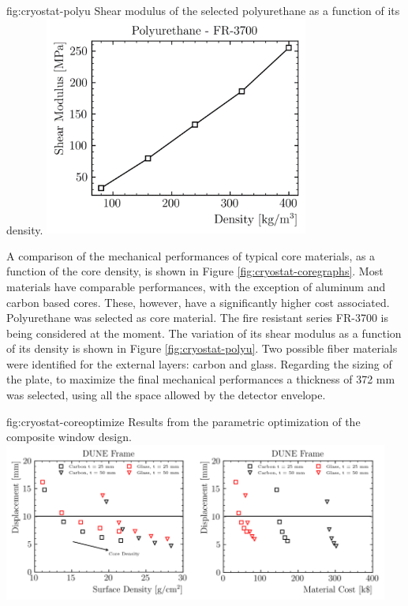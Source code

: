 \begin{dunefigure}{fig:cryostat-polyu}
{Shear modulus of the selected polyurethane as a function of its density.}
\includegraphics[width=0.65\textwidth]{graphics/cryostat/cryostat-polyu.png}
\end{dunefigure}

A comparison of the mechanical performances of typical core materials, as a function of the core density, is shown in Figure \ref{fig:cryostat-coregraphs}. Most materials have comparable performances, with the exception of aluminum and carbon based cores. These, however, have a significantly higher cost associated. Polyurethane was selected as core material. The fire resistant series FR-3700 is being considered at the moment. The variation of its shear modulus as a function of its density is shown in Figure \ref{fig:cryostat-polyu}. Two possible fiber materials were identified for the external layers: carbon and glass. Regarding the sizing of the plate, to maximize the final mechanical performances a thickness of 372 mm was selected, using all the space allowed by the detector envelope.

\begin{dunefigure}{fig:cryostat-coreoptimize}
{Results from the parametric optimization of the composite window design.}
\includegraphics[width=0.95\textwidth]{graphics/cryostat/cryostat-coreoptimize.png}
\end{dunefigure}

